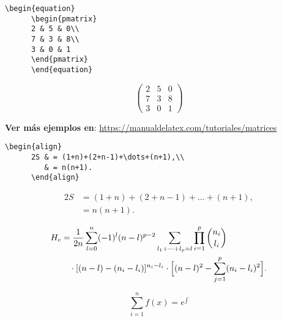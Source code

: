 \begin{minipage}{0.5\textwidth}
  \begin{lstlisting}[caption = Matrix 01]
    \begin{equation}
      \begin{pmatrix}
      2 & 5 & 0\\
      7 & 3 & 8\\
      3 & 0 & 1
      \end{pmatrix}
      \end{equation}
    \end{lstlisting}
\end{minipage}
\begin{minipage}{0.5\textwidth}
  \begin{equation}
    \begin{pmatrix}
    2 & 5 & 0\\
    7 & 3 & 8\\
    3 & 0 & 1
    \end{pmatrix}
    \end{equation}
\end{minipage}

\textbf{Ver más ejemplos en}: \url{https://manualdelatex.com/tutoriales/matrices}

\begin{minipage}{0.5\textwidth}
  \begin{lstlisting}[caption = Ejemplo para alinear ecuaciones]
    \begin{align}
      2S & = (1+n)+(2+n-1)+\dots+(n+1),\\
         & = n(n+1).
      \end{align}
    \end{lstlisting}
\end{minipage}
\begin{minipage}{0.5\textwidth}
  \begin{align}
    2S & = (1+n)+(2+n-1)+\dots+(n+1),\\
       & = n(n+1).
    \end{align}
\end{minipage}

\begin{equation}
  \begin{split}
    H_c&=\frac{1}{2n} \sum^n_{l=0}(-1)^{l}(n-{l})^{p-2}
    \sum_{l _1+\dots+ l _p=l}\prod^p_{i=1} \binom{n_i}{l _i}\\
    &\quad\cdot[(n-l )-(n_i-l _i)]^{n_i-l _i}\cdot
    \Bigl[(n-l )^2-\sum^p_{j=1}(n_i-l _i)^2\Bigr].
  \end{split}
\end{equation}


\begin{equation}
\label{eq:suma}
\sum^n_{i=1} f (x) = e^{\displaystyle \int}
\end{equation}

